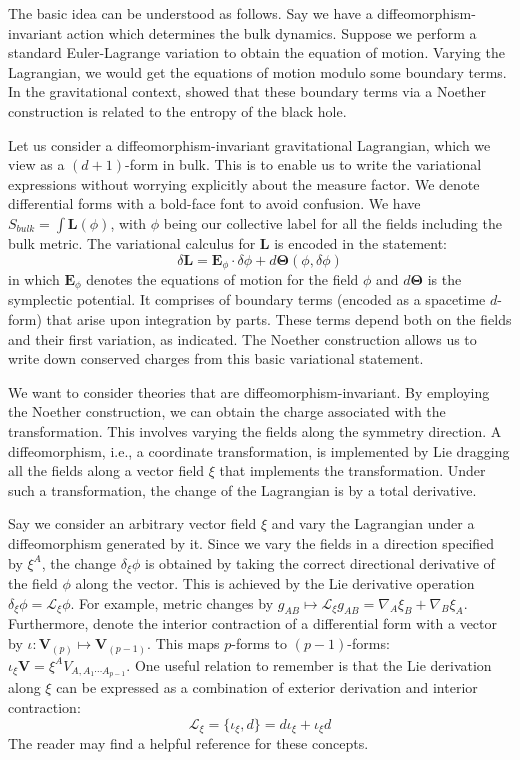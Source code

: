 \documentclass[12pt,openany]{book}
\begin{document}
The basic idea can be understood as follows. Say we have a diffeomorphism-invariant  action which determines the bulk dynamics. Suppose we perform a standard Euler-Lagrange variation to obtain the equation of motion. Varying the Lagrangian, we would get the equations of motion modulo some boundary terms. In the gravitational context, \cite{Iyer:1994ys} showed that these boundary terms via a Noether construction is related to the entropy of the black hole.

Let us consider a diffeomorphism-invariant gravitational Lagrangian, which we view as a $(d+1)$-form in bulk. This is to enable us to write the variational expressions without worrying explicitly about the measure factor. We denote differential forms with a bold-face font to avoid confusion. We have $S_{bulk} = \int \mathbf{L}(\phi)$, with $\phi$ being our collective label for all the fields including the bulk metric. The variational calculus for $\mathbf{L}$ is encoded in the statement:
%
\begin{equation}
\delta \mathbf{L} = \mathbf{E}_\phi \cdot \delta \phi   + d{\bm{\Theta}}(\phi,\delta\phi)
\label{eq:varL}
\end{equation}
%
in which $\mathbf{E}_\phi$ denotes the equations of motion for the field $\phi$ and $d\bm{\Theta}$ is the symplectic potential. It comprises  of boundary terms (encoded as a spacetime $d$-form) that arise upon integration by parts. These terms depend both on the fields and their first variation, as indicated. The Noether construction allows us to write down conserved charges from this basic variational statement.

We want to consider theories that are diffeomorphism-invariant. By employing the Noether construction, we can obtain the charge associated with the transformation. This involves varying the fields along the symmetry direction.  A diffeomorphism, i.e., a coordinate transformation, is implemented by Lie dragging all the fields along a vector field $\xi$ that implements the transformation.
Under such a transformation, the change of the Lagrangian is by a total derivative.

Say we consider an arbitrary vector field $\xi$ and vary the Lagrangian under a diffeomorphism generated by it. Since we vary the fields in a direction specified by $\xi^A$, the change $\delta_\xi \phi$ is obtained by taking the correct directional derivative of the field $\phi$ along the vector. This is achieved by the Lie derivative operation $\delta_\xi \phi  = \mathscr{L}_\xi \phi$. For example, metric changes by $g_{AB} \mapsto \mathscr{L}_\xi g_{AB} = \nabla_A\xi_B + \nabla_B \xi_A$.   Furthermore, denote the interior contraction of a differential form with a vector by
$\iota: \mathbf{V}_{(p)} \mapsto \mathbf{V}_{(p-1)}$. This maps $p$-forms to $(p-1)$-forms: $ \iota_\xi \mathbf{V} = \xi^A V_{A,A_1\cdots A_{p-1}}$. One useful relation to remember is that the Lie derivation along $\xi$ can be expressed as a combination of exterior derivation and interior contraction:
%
\begin{equation}
\mathscr{L}_\xi =\{\iota_\xi, d\} =  d\iota_\xi + \iota_\xi d
\label{eq:Ldi}
\end{equation}
%
The reader may find \cite{Wald:1984ai} a helpful reference for these concepts.
\end{document}
